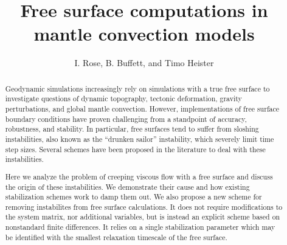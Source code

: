 \documentclass[preprint,12pt,authoryear]{elsarticle}
\begin{document}
\begin{frontmatter}



\title{Free surface computations in mantle convection models}


\author{I. Rose, B. Buffett, and Timo Heister}



\address{}

\begin{abstract}
Geodynamic simulations increasingly rely on simulations with a true free surface to 
investigate questions of dynamic topography, tectonic deformation, gravity perturbations, and
global mantle convection. However, implementations of free surface boundary conditions 
have proven challenging from a standpoint of accuracy, robustness, and stability.
In particular, free surfaces tend to suffer from sloshing instabilities, also known as 
the ``drunken sailor'' instability, which severely limit time step sizes. Several 
schemes have been proposed in the literature to deal with these instabilities.

Here we analyze the problem of creeping viscous flow with a free surface and discuss the 
origin of these instabilities. We demonstrate their cause and how existing stabilization 
schemes work to damp them out.
We also propose a new scheme for removing instabilites from free surface calculations. 
It does not require modifications to the system matrix, nor additional variables, but is instead
an explicit scheme based on nonstandard finite differences.  It relies on a single 
stabilization parameter which may be identified with the smallest relaxation timescale of the
free surface.


\end{abstract}
\end{frontmatter}
\end{document}
